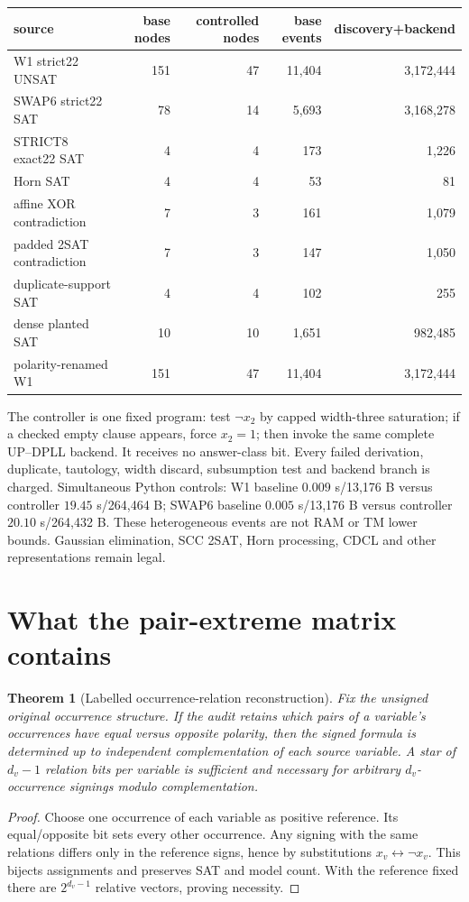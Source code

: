 \documentclass[10pt]{article}
\newtheorem{theorem}{Theorem}
\begin{document}
\begin{center}\small
\begin{tabular}{lrrrr}
\toprule source & base nodes & controlled nodes & base events & discovery+backend\\\midrule
W1 strict22 UNSAT&151&47&11,404&3,172,444\\
SWAP6 strict22 SAT&78&14&5,693&3,168,278\\
STRICT8 exact22 SAT&4&4&173&1,226\\
Horn SAT&4&4&53&81\\
affine XOR contradiction&7&3&161&1,079\\
padded 2SAT contradiction&7&3&147&1,050\\
duplicate-support SAT&4&4&102&255\\
dense planted SAT&10&10&1,651&982,485\\
polarity-renamed W1&151&47&11,404&3,172,444\\\bottomrule
\end{tabular}
\end{center}

The controller is one fixed program: test $\neg x_2$ by capped width-three saturation; if a checked empty clause appears, force $x_2=1$; then invoke the same complete UP--DPLL backend. It receives no answer-class bit. Every failed derivation, duplicate, tautology, width discard, subsumption test and backend branch is charged. Simultaneous Python controls: W1 baseline $0.009$ s/13,176 B versus controller $19.45$ s/264,464 B; SWAP6 baseline $0.005$ s/13,176 B versus controller $20.10$ s/264,432 B. These heterogeneous events are not RAM or TM lower bounds. Gaussian elimination, SCC 2SAT, Horn processing, CDCL and other representations remain legal.

\section{What the pair-extreme matrix contains}
\begin{theorem}[Labelled occurrence-relation reconstruction]\label{thm:code}
Fix the unsigned original occurrence structure. If the audit retains which pairs of a variable's occurrences have equal versus opposite polarity, then the signed formula is determined up to independent complementation of each source variable. A star of $d_v-1$ relation bits per variable is sufficient and necessary for arbitrary $d_v$-occurrence signings modulo complementation.
\end{theorem}
\begin{proof}
Choose one occurrence of each variable as positive reference. Its equal/opposite bit sets every other occurrence. Any signing with the same relations differs only in the reference signs, hence by substitutions $x_v\leftrightarrow\neg x_v$. This bijects assignments and preserves SAT and model count. With the reference fixed there are $2^{d_v-1}$ relative vectors, proving necessity.
\end{proof}
\end{document}
